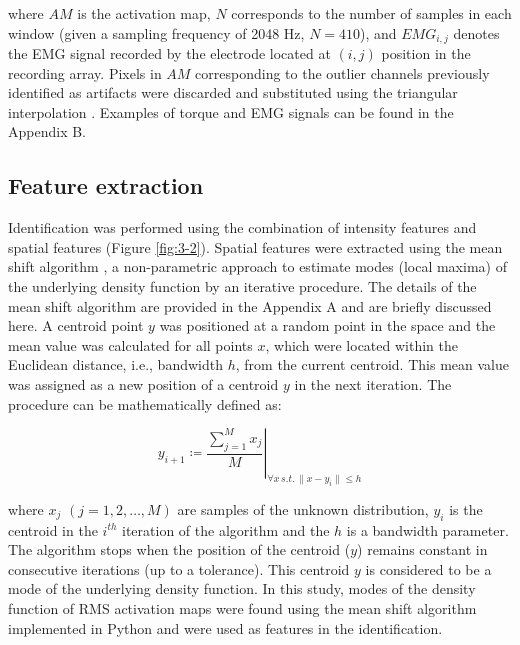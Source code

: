 where $AM$ is the activation map, $N$ corresponds to the number of samples in each window (given a sampling frequency of 2048 Hz, $N = 410$), and $EMG_{i,j}$ denotes the EMG signal recorded by the electrode located at $(i,j)$ position in the recording array. Pixels in $AM$ corresponding to the outlier channels previously identified as artifacts were discarded and substituted using the triangular interpolation \citep{Rojas-Martinez2012}. Examples of torque and EMG signals can be found in the Appendix B.


\subsection{Feature extraction}
Identification was performed using the combination of intensity features and spatial features (Figure \ref{fig:3-2}). Spatial features were extracted using the mean shift algorithm \citep{Comaniciu2002}, a non-parametric approach to estimate modes (local maxima) of the underlying density function by an iterative procedure. The details of the mean shift algorithm are provided in the Appendix A and are briefly discussed here. A centroid point $y$ was positioned at a random point in the space and the mean value was calculated for all points $x$, which were located within the Euclidean distance, i.e., bandwidth $h$, from the current centroid. This mean value was assigned as a new position of a centroid $y$ in the next iteration. The procedure can be mathematically defined as:

\begin{equation} \label{eq:3-2}
\left. y_{i+1} \coloneqq \frac{\sum_{j=1}^{M} x_j}{M} \right\vert_{\forall x \,s.t. \,\parallel x-y_i \parallel \leq h}
\end{equation}

where $x_j$ $(j = 1, 2, …, M)$ are samples of the unknown distribution, $y_i$ is the centroid in the $i^{th}$ iteration of the algorithm and the $h$ is a bandwidth parameter. The algorithm stops when the position of the centroid ($y$) remains constant in consecutive iterations (up to a tolerance). This centroid $y$ is considered to be a mode of the underlying density function. In this study, modes of the density function of RMS activation maps were found using the mean shift algorithm implemented in Python \citep{scikit-learn} and were used as features in the identification.

